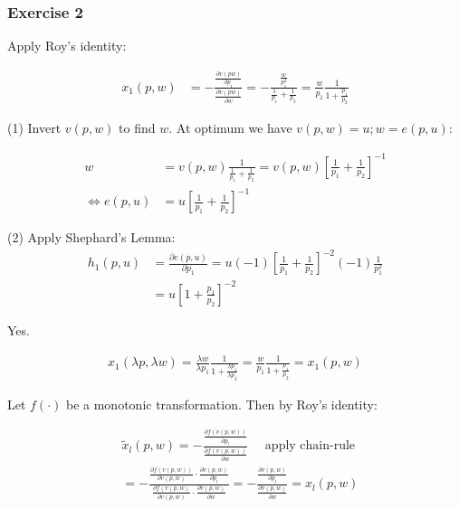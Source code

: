 {
\subsubsection*{Exercise 2}

\begin{enumerate}[label=(\alph*)]
{\item
Apply Roy's identity:

\begin{align*}
    x_1(p,w) &= -\frac{\frac{\partial v(p w)}{\partial p_1}}{\frac{\partial v(p w)}{\partial w}} = -\frac{\frac{w}{p_1^2}}{\frac{1}{p_1} + \frac{1}{p_2}} = \frac{w}{p_1} \frac{1}{1+\frac{p_1}{p_2}}
\end{align*}
}
{\item
(1) Invert $v(p, w)$ to find $w$. At optimum we have $v(p, w)=u ; w=e(p, u)$:

\begin{align*}
    w & =v\left(p, w\right) \frac{1}{\frac{1}{p_1}+\frac{1}{p_2}}=v\left(p, w\right)\left[\frac{1}{p_1}+\frac{1}{p_2}\right]^{-1} \\
    \Longleftrightarrow e\left(p, u\right) & =u\left[\frac{1}{p_1}+\frac{1}{p_2}\right]^{-1}
\end{align*}

(2) Apply Shephard's Lemma:
\begin{align*}
    h_1(p, u) & =\frac{\partial e\left(p,u\right)}{\partial p_1}=u(-1)\left[\frac{1}{p_1}+\frac{1}{p_2}\right]^{-2}(-1) \frac{1}{p_1^2} \\
    & =u\left[1+\frac{p_1}{p_2}\right]^{-2}
\end{align*}
}
{\item 
Yes.

\begin{align*}
    x_1\left(\lambda p, \lambda w\right)=\frac{\lambda w}{\lambda p_1} \frac{1}{1+\frac{\lambda p_1}{\lambda p_2}}=\frac{w}{p_1} \frac{1}{1+\frac{p_1}{p_2}}=x_1\left(p, w\right)
\end{align*}
}
{\item 
Let $f(\cdot)$ be a monotonic transformation.
Then by Roy's identity:

\begin{align*}
    & \tilde{x}_l(p, w)=-\frac{\frac{\partial f(v(p, w))}{\partial p_l}}{\frac{\partial f(v(p,w))}{\partial w}} \quad \text { apply chain-rule } \\
    & =-\frac{\frac{\partial f\left(v\left(p, w\right)\right)}{\partial v\left(p, w\right)} \cdot \frac{\partial v\left(p, w\right)}{\partial p_l}}{\frac{\partial f\left(v\left(p, w\right)\right.}{\partial v(p, w)} \cdot \frac{\partial v\left(p, w\right)}{\partial w}} 
    =-\frac{\frac{\partial v\left(p, w\right)}{\partial p_l}}{\frac{\partial v(p, w)}{\partial w}}=x_l(p, w)
\end{align*}
}
\end{enumerate}
}

